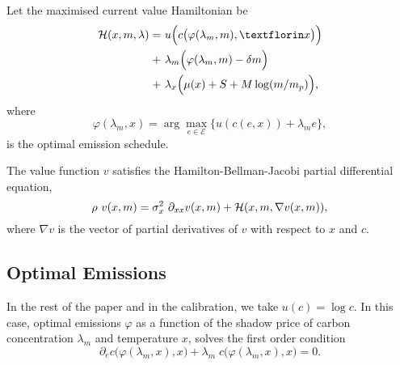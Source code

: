 \documentclass[../../main.tex]{subfiles}
\begin{document}
\begin{definition}
    Let the maximised current value Hamiltonian be \begin{equation}
        \begin{split}
            \H(x, m, \mathbf{\lambda}) = \ &u\Big(c\big(\varphi(\lambda_m, m), ƒx \big) \Big) \\
            + \ &\lambda_m \Big(\varphi(\lambda_m, m) - \delta m\Big) \\
            + \ &\lambda_x \Big(\mu(x) + S + M \log(m / m_p)\Big),
        \end{split}
    \end{equation} where \begin{equation}
        \varphi(\lambda_m, x) = \arg\max_{e \in \mathcal{E}} \Big\{ u(c(e, x)) + \lambda_m e \Big\},
    \end{equation} is the optimal emission schedule.
\end{definition}

\begin{proposition}
    The value function $v$ satisfies the Hamilton-Bellman-Jacobi partial differential equation, \begin{equation} \label{eq:hbj}
        \rho \ v(x, m) = \sigma^2_x \ \partial_{x x} v(x, m) + \mathcal{H}(x, m, \nabla v(x, m)),
    \end{equation} where $\nabla v$ is the vector of partial derivatives of $v$ with respect to $x$ and $c$.
\end{proposition}

\subsection{Optimal Emissions}

In the rest of the paper and in the calibration, we take $u(c) = \log c$. In this case, optimal emissions $\varphi$ as a function of the shadow price of carbon concentration $\lambda_m$ and temperature $x$, solves the first order condition \begin{equation}
    \partial_e c \Big(\varphi(\lambda_m, x), x\Big) + \lambda_m \; c\Big(\varphi(\lambda_m, x), x\Big) = 0.
\end{equation}
\end{document}
